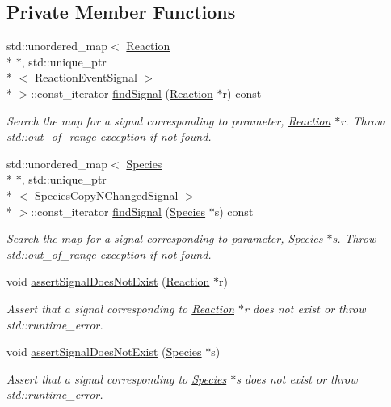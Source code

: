 \subsection*{Private Member Functions}
\begin{DoxyCompactItemize}
\item 
std\-::unordered\-\_\-map$<$ \hyperlink{classReaction}{Reaction} \\*
$\ast$, std\-::unique\-\_\-ptr\\*
$<$ \hyperlink{Signaling_8h_aa6022d69bb45ab7f3c304c00f34199fd}{Reaction\-Event\-Signal} $>$\\*
 $>$\-::const\-\_\-iterator \hyperlink{classSignalingManager_acb3e599d14790ceba69dc0ca21c04221}{find\-Signal} (\hyperlink{classReaction}{Reaction} $\ast$r) const 
\begin{DoxyCompactList}\small\item\em Search the map for a signal corresponding to parameter, \hyperlink{classReaction}{Reaction} $\ast$r. Throw std\-::out\-\_\-of\-\_\-range exception if not found. \end{DoxyCompactList}\item 
std\-::unordered\-\_\-map$<$ \hyperlink{classSpecies}{Species} \\*
$\ast$, std\-::unique\-\_\-ptr\\*
$<$ \hyperlink{Signaling_8h_add19c738ac9a6c73d5900828cf915993}{Species\-Copy\-N\-Changed\-Signal} $>$\\*
 $>$\-::const\-\_\-iterator \hyperlink{classSignalingManager_ae5aa60f34cdb366d0ed4b7a8f1e1f41a}{find\-Signal} (\hyperlink{classSpecies}{Species} $\ast$s) const 
\begin{DoxyCompactList}\small\item\em Search the map for a signal corresponding to parameter, \hyperlink{classSpecies}{Species} $\ast$s. Throw std\-::out\-\_\-of\-\_\-range exception if not found. \end{DoxyCompactList}\item 
void \hyperlink{classSignalingManager_aeb31ec544156068f1965762e89e97191}{assert\-Signal\-Does\-Not\-Exist} (\hyperlink{classReaction}{Reaction} $\ast$r)
\begin{DoxyCompactList}\small\item\em Assert that a signal corresponding to \hyperlink{classReaction}{Reaction} $\ast$r does not exist or throw std\-::runtime\-\_\-error. \end{DoxyCompactList}\item 
void \hyperlink{classSignalingManager_a023cb88a4035feb39f5e0f6f52c174f8}{assert\-Signal\-Does\-Not\-Exist} (\hyperlink{classSpecies}{Species} $\ast$s)
\begin{DoxyCompactList}\small\item\em Assert that a signal corresponding to \hyperlink{classSpecies}{Species} $\ast$s does not exist or throw std\-::runtime\-\_\-error. \end{DoxyCompactList}\end{DoxyCompactItemize}
